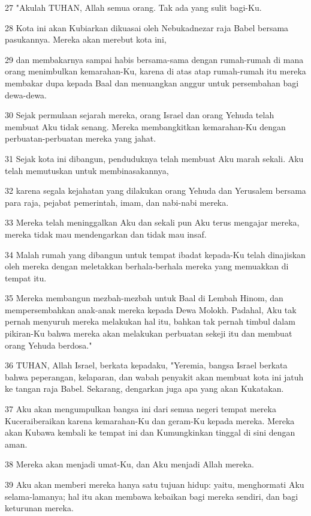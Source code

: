\par 27 "Akulah TUHAN, Allah semua orang. Tak ada yang sulit bagi-Ku.
\par 28 Kota ini akan Kubiarkan dikuasai oleh Nebukadnezar raja Babel bersama pasukannya. Mereka akan merebut kota ini,
\par 29 dan membakarnya sampai habis bersama-sama dengan rumah-rumah di mana orang menimbulkan kemarahan-Ku, karena di atas atap rumah-rumah itu mereka membakar dupa kepada Baal dan menuangkan anggur untuk persembahan bagi dewa-dewa.
\par 30 Sejak permulaan sejarah mereka, orang Israel dan orang Yehuda telah membuat Aku tidak senang. Mereka membangkitkan kemarahan-Ku dengan perbuatan-perbuatan mereka yang jahat.
\par 31 Sejak kota ini dibangun, penduduknya telah membuat Aku marah sekali. Aku telah memutuskan untuk membinasakannya,
\par 32 karena segala kejahatan yang dilakukan orang Yehuda dan Yerusalem bersama para raja, pejabat pemerintah, imam, dan nabi-nabi mereka.
\par 33 Mereka telah meninggalkan Aku dan sekali pun Aku terus mengajar mereka, mereka tidak mau mendengarkan dan tidak mau insaf.
\par 34 Malah rumah yang dibangun untuk tempat ibadat kepada-Ku telah dinajiskan oleh mereka dengan meletakkan berhala-berhala mereka yang memuakkan di tempat itu.
\par 35 Mereka membangun mezbah-mezbah untuk Baal di Lembah Hinom, dan mempersembahkan anak-anak mereka kepada Dewa Molokh. Padahal, Aku tak pernah menyuruh mereka melakukan hal itu, bahkan tak pernah timbul dalam pikiran-Ku bahwa mereka akan melakukan perbuatan sekeji itu dan membuat orang Yehuda berdosa."
\par 36 TUHAN, Allah Israel, berkata kepadaku, "Yeremia, bangsa Israel berkata bahwa peperangan, kelaparan, dan wabah penyakit akan membuat kota ini jatuh ke tangan raja Babel. Sekarang, dengarkan juga apa yang akan Kukatakan.
\par 37 Aku akan mengumpulkan bangsa ini dari semua negeri tempat mereka Kuceraiberaikan karena kemarahan-Ku dan geram-Ku kepada mereka. Mereka akan Kubawa kembali ke tempat ini dan Kumungkinkan tinggal di sini dengan aman.
\par 38 Mereka akan menjadi umat-Ku, dan Aku menjadi Allah mereka.
\par 39 Aku akan memberi mereka hanya satu tujuan hidup: yaitu, menghormati Aku selama-lamanya; hal itu akan membawa kebaikan bagi mereka sendiri, dan bagi keturunan mereka.
